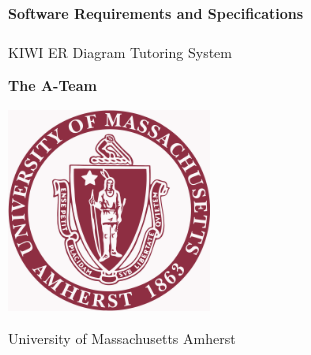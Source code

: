 \begin{titlepage}
    \begin{center}
        \vspace*{1cm}
        
 
        \HRule \\[0.4cm]
        {   \huge\textbf{Software Requirements and Specifications}\\[0.4cm] }
        \HRule \\[1cm]
       
        
        \vspace{0.5cm}
        \LARGE
        KIWI ER Diagram Tutoring System
        
        \vspace{1.5cm}
        
        \textbf{The A-Team}
        
        \vfill

        \vspace{0.8cm}
        
        \includegraphics[width=0.4\textwidth]{UMASS_logo}
        
        \Large
University of Massachusetts Amherst
        
    \end{center}
\end{titlepage}
